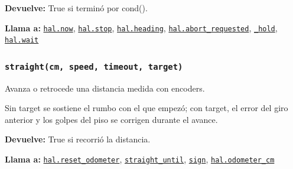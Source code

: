 \par{}\par\smallskip
\noindent\textbf{Devuelve:} True si terminó por cond().\par
\noindent\textbf{Llama a:} \hyperref[fn:hal:now]{\texttt{hal.now}}, \hyperref[fn:hal:stop]{\texttt{hal.stop}}, \hyperref[fn:hal:heading]{\texttt{hal.heading}}, \hyperref[fn:hal:abort-requested]{\texttt{hal.abort\_\allowbreak{}requested}}, \hyperref[fn:motion:-hold]{\texttt{\_\allowbreak{}hold}}, \hyperref[fn:hal:wait]{\texttt{hal.wait}}\par

\subsubsection{\texttt{straight(cm, speed, timeout, target)}}\label{fn:motion:straight}
\noindent Avanza o retrocede una distancia medida con encoders.

Sin target se sostiene el rumbo con el que empezó; con target, el error del giro anterior y los golpes del piso se corrigen durante el avance.

\par{}\par\smallskip
\noindent\textbf{Devuelve:} True si recorrió la distancia.\par
\noindent\textbf{Llama a:} \hyperref[fn:hal:reset-odometer]{\texttt{hal.reset\_\allowbreak{}odometer}}, \hyperref[fn:motion:straight-until]{\texttt{straight\_\allowbreak{}until}}, \hyperref[fn:motion:sign]{\texttt{sign}}, \hyperref[fn:hal:odometer-cm]{\texttt{hal.odometer\_\allowbreak{}cm}}\par

